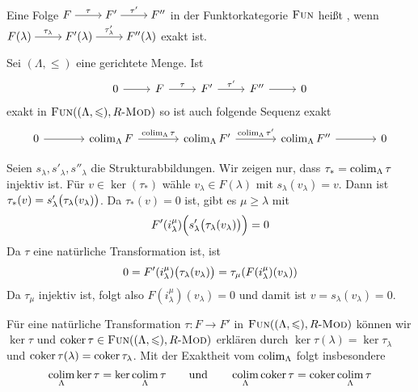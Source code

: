 \begin{definition}[{name=[Exaktheit in der Funktorkategorie]}]
	Eine Folge 
	\( \begin{tikzcd}[cramped]
		F \rar["\tau"] & F' \rar["\tau'"] & F''
	\end{tikzcd} \) 
	in der Funktorkategorie $\textsc{Fun}$ heißt , wenn 
	\( \begin{tikzcd}[cramped]
		F(\lambda)\rar["\tau_\lambda"] & F'(\lambda) \rar["\tau_\lambda'"] & F''(\lambda)
	\end{tikzcd} \) 
	exakt ist.
\end{definition}


\begin{satz}[name={Exaktheit gerichteter Kolimiten}]
	Sei $(\Lambda,\le)$ eine gerichtete Menge. Ist 
	\[
		\begin{tikzcd}
			0 \rar & F \rar["\tau"] & F' \rar["\tau'"] & F'' \rar & 0
		\end{tikzcd}
	\]
	exakt in $\FUN \enbrace*{(\Lambda,\le), R\text{-}\MOD}$ so ist auch folgende Sequenz exakt
	\[
		\begin{tikzcd}[sep=large]
			0 \rar & \colim_\Lambda F \rar["\colim_\Lambda \tau"] & \colim_\Lambda F' \rar["\colim_\Lambda \tau'"] & \colim_\Lambda F'' \rar & 0
		\end{tikzcd}
	\]
\end{satz}
\begin{beweis}
	Seien $s_\lambda, s'_\lambda, s''_\lambda$ die Strukturabbildungen. 
	Wir zeigen nur, dass $\tau_* =\operatorname*{colim}_\Lambda \tau$ injektiv ist. 
	Für $v \in \ker (\tau_*)$ wähle $v_\lambda \in F(\lambda)$ mit $s_\lambda(v_\lambda)=v$.
	Dann ist $\tau_*(v)=s_\lambda'\enbrace[\big]{\tau_\lambda \enbrace*{v_\lambda}}$.
	Da $\tau_*(v)=0$ ist, gibt es $\mu \ge \lambda$ mit 
	\[
		F'(i_\lambda^\mu) \enbrace[\Big]{s_\lambda'\enbrace[\big]{\tau_\lambda \enbrace*{v_\lambda}}}=0
	\]
	Da $\tau$ eine natürliche Transformation ist, ist 
	\begin{align}
		0=F'(i_\lambda^\mu) \enbrace[\big]{ \tau_\lambda(v_\lambda)} = \tau_\mu \enbrace*{F(i_\lambda^\mu)(v_\lambda)}
	\end{align}
	Da $\tau_\mu$ injektiv ist, folgt also $F(i_\lambda^\mu)(v_\lambda)=0$ und damit ist $v=s_\lambda(v_\lambda)=0$.
\end{beweis}

\begin{bemerkung}[{name=[gerichteter Kolimes von Kern und Kokern]}]
	Für eine natürliche Transformation $\tau \colon F \to F'$ in $\FUN \enbrace*{(\Lambda,\le),R \text{-}\MOD}$ können wir $\ker \tau$ und $\coker \tau \in \FUN \enbrace*{(\Lambda,\le), R \text{-}\MOD}$ erklären durch $\ker \tau (\lambda) = \ker \tau_\lambda$ und $\operatorname{coker} \tau(\lambda) = \operatorname{coker} \tau_\lambda$.
	Mit der Exaktheit vom $\operatorname*{colim}_\Lambda$ folgt insbesondere
	\[
		\operatorname*{colim}_\Lambda \ker \tau = \ker \operatorname*{colim}_\Lambda \tau \qquad \text{und} \qquad \operatorname*{colim}_\Lambda \operatorname{coker} \tau = \operatorname{coker} \operatorname*{colim}_\Lambda \tau
	\]
\end{bemerkung}

